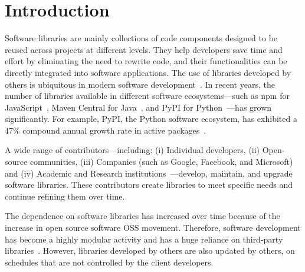 \chapter{Introduction}\label{intro}
Software libraries are mainly collections of code components designed to be reused
across projects at different levels. They help developers save time and effort by
eliminating the need to rewrite code, and their functionalities can be directly integrated
into software applications.
The use of libraries developed by others is ubiquitous in modern
software development~\cite{huang22:_charac_java,wang20:_java}.
In recent years, the number of libraries available in different software ecosystems—such
as npm for JavaScript~\cite{ecmascript}, Maven Central for Java~\cite{java}, and PyPI for Python~\cite{python}—has grown significantly. For example, PyPI, the Python
software ecosystem, has exhibited a 47\% compound annual growth rate in active packages~\cite{Bommarito2019}.

A wide range of contributors—including: (i) Individual developers, (ii) Open-source communities, (iii) Companies
(such as Google, Facebook, and Microsoft) and (iv) Academic and Research
institutions~\cite{Lakhani2000OSS}—develop, maintain, and upgrade software libraries.
These contributors create libraries to meet specific needs and continue refining them over time.

The dependence on software libraries has increased over time because of the increase in open source software
{OSS} movement. Therefore, software development has become a
highly modular activity and has a huge reliance on third-party libraries~\cite{decan2019empirical, zerouali2019formal, cox2019surviving}.
However, libraries developed by others are also updated by others, on schedules that are not controlled by
the client developers.


